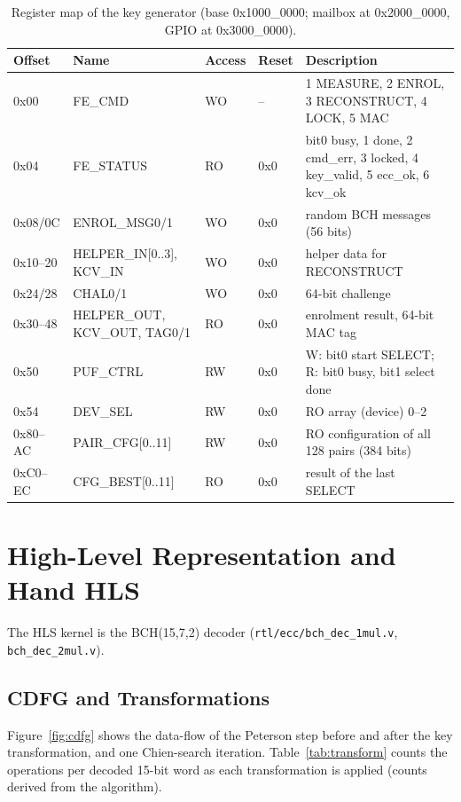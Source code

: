\documentclass[11pt,a4paper]{article}
\begin{document}
\begin{table}[H]\centering\small
\caption{Register map of the key generator (base 0x1000\_0000; mailbox at 0x2000\_0000, GPIO at 0x3000\_0000).}\label{tab:regmap}
\begin{tabular}{@{}llllp{5.4cm}@{}}
\toprule
Offset & Name & Access & Reset & Description\\
\midrule
0x00 & FE\_CMD & WO & -- & 1 MEASURE, 2 ENROL, 3 RECONSTRUCT, 4 LOCK, 5 MAC\\
0x04 & FE\_STATUS & RO & 0x0 & bit0 busy, 1 done, 2 cmd\_err, 3 locked, 4 key\_valid, 5 ecc\_ok, 6 kcv\_ok\\
0x08/0C & ENROL\_MSG0/1 & WO & 0x0 & random BCH messages (56 bits)\\
0x10--20 & HELPER\_IN[0..3], KCV\_IN & WO & 0x0 & helper data for RECONSTRUCT\\
0x24/28 & CHAL0/1 & WO & 0x0 & 64-bit challenge\\
0x30--48 & HELPER\_OUT, KCV\_OUT, TAG0/1 & RO & 0x0 & enrolment result, 64-bit MAC tag\\
0x50 & PUF\_CTRL & RW & 0x0 & W: bit0 start SELECT; R: bit0 busy, bit1 select done\\
0x54 & DEV\_SEL & RW & 0x0 & RO array (device) 0--2\\
0x80--AC & PAIR\_CFG[0..11] & RW & 0x0 & RO configuration of all 128 pairs (384 bits)\\
0xC0--EC & CFG\_BEST[0..11] & RO & 0x0 & result of the last SELECT\\
\bottomrule
\end{tabular}
\end{table}

\section{High-Level Representation and Hand HLS}
\label{sec:hls}
The HLS kernel is the BCH(15,7,2) decoder (\texttt{rtl/ecc/bch\_dec\_1mul.v}, \texttt{bch\_dec\_2mul.v}).

\subsection{CDFG and Transformations}
Figure~\ref{fig:cdfg} shows the data-flow of the Peterson step before and after the key transformation,
and one Chien-search iteration. Table~\ref{tab:transform} counts the operations per decoded 15-bit word
as each transformation is applied (counts derived from the algorithm).
\end{document}
